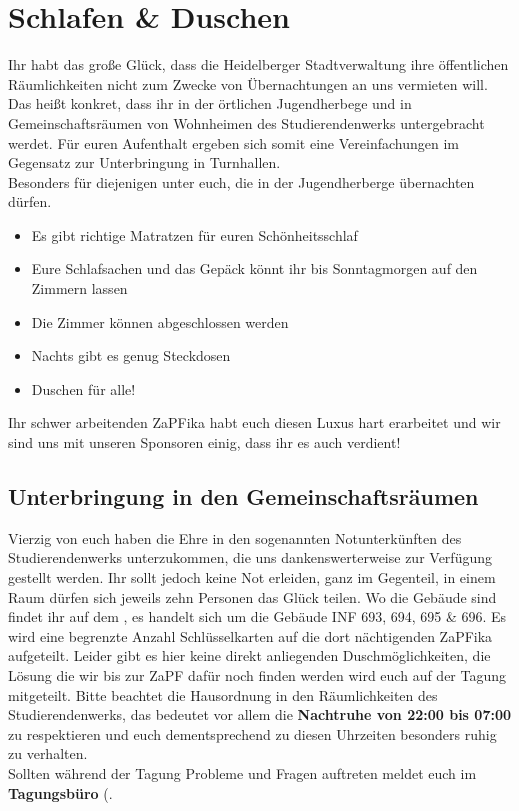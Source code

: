 
\section{Schlafen \& Duschen}
Ihr habt das große Glück, dass die Heidelberger Stadtverwaltung ihre öffentlichen Räumlichkeiten nicht zum Zwecke von Übernachtungen an uns vermieten will. Das heißt konkret, dass ihr in der örtlichen Jugendherbege und in Gemeinschaftsräumen von Wohnheimen des Studierendenwerks untergebracht werdet. Für euren Aufenthalt ergeben sich somit eine Vereinfachungen im Gegensatz zur Unterbringung in Turnhallen.\\
Besonders für diejenigen unter euch, die in der Jugendherberge übernachten dürfen.
\begin{itemize}
  \item Es gibt richtige Matratzen für euren Schönheitsschlaf
  \item Eure Schlafsachen und das Gepäck könnt ihr bis Sonntagmorgen auf den Zimmern lassen
  \item Die Zimmer können abgeschlossen werden
  \item Nachts gibt es genug Steckdosen
  \item Duschen für alle!
\end{itemize}
Ihr schwer arbeitenden ZaPFika habt euch diesen Luxus hart erarbeitet und wir sind uns mit unseren Sponsoren einig, dass ihr es auch verdient! \\

\subsection{Unterbringung in den Gemeinschaftsräumen}
Vierzig von euch haben die Ehre in den sogenannten Notunterkünften des Studierendenwerks unterzukommen, die uns dankenswerterweise zur Verfügung gestellt werden. 
Ihr sollt jedoch keine Not erleiden, ganz im Gegenteil, in einem Raum dürfen sich jeweils zehn Personen das Glück teilen. Wo die Gebäude sind findet ihr auf dem , es handelt sich um die Gebäude INF 693, 694, 695 \& 696. Es wird eine begrenzte Anzahl Schlüsselkarten auf die dort nächtigenden ZaPFika aufgeteilt. Leider gibt es hier keine direkt anliegenden Duschmöglichkeiten, die Lösung die wir bis zur ZaPF dafür noch finden werden wird euch auf der Tagung mitgeteilt.
Bitte beachtet die Hausordnung in den Räumlichkeiten des Studierendenwerks, das bedeutet vor allem die \textbf{Nachtruhe von 22:00 bis 07:00} zu respektieren und euch dementsprechend zu diesen Uhrzeiten besonders ruhig zu verhalten.\\
Sollten während der Tagung Probleme und Fragen auftreten meldet euch im \textbf{Tagungsbüro} (.

